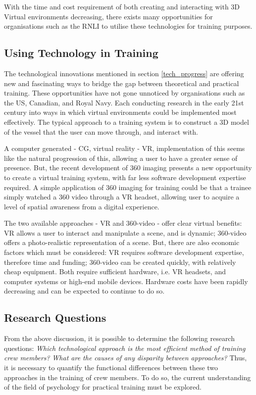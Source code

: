 \documentclass[a4paper, openright, twoside]{report}
\begin{document}
With the time and cost requirement of both creating and interacting with 3D Virtual environments decreasing, there exists many opportunities for organisations such as the RNLI to utilise these technologies for training purposes. 

\subsection{Using Technology in Training }
The technological innovations mentioned in section \ref{tech_progress} are offering new and fascinating ways to bridge the gap between theoretical and practical training.  These opportunities have not gone unnoticed by organisations such as the US, Canadian, and Royal Navy. Each conducting research in the early 21st century into ways in which virtual environments could be implemented most effectively. The typical approach to a training system is to construct a 3D model of the vessel that the user can move through, and interact with. 

A computer generated - CG, virtual reality - VR, implementation of this seems like the natural progression of this, allowing a user to have a greater sense of presence. But, the recent development of 360 imaging presents a new opportunity to create a virtual training system, with far less software development expertise required. A simple application of 360 imaging for training could be that a trainee simply watched a 360 video through a VR headset, allowing user to acquire a level of spatial awareness from a digital experience.

The two available approaches - VR and 360-video - offer clear virtual benefits: VR allows a user to interact and manipulate a scene, and is dynamic; 360-video offers a photo-realistic representation of a scene. But, there are also economic factors which must be considered: VR requires software development expertise, therefore time and funding; 360-video can be created quickly, with relatively cheap equipment. Both require sufficient hardware, i.e. VR headsets, and computer systems or high-end mobile devices.  Hardware costs have been rapidly decreasing and can be expected to continue to do so. 

\subsection{Research Questions}\label{research} 
From the above discussion, it is possible to determine the following research questions:
\hfill \break
\textit{Which technological approach is the most efficient method of training crew members?}
\hfill \break
\textit{What are the causes of any disparity between approaches?}
\hfill \break
Thus, it is necessary to quantify the functional differences between these two approaches in the training of crew members. To do so, the current understanding of the field of psychology for practical training must be explored.
\end{document}
